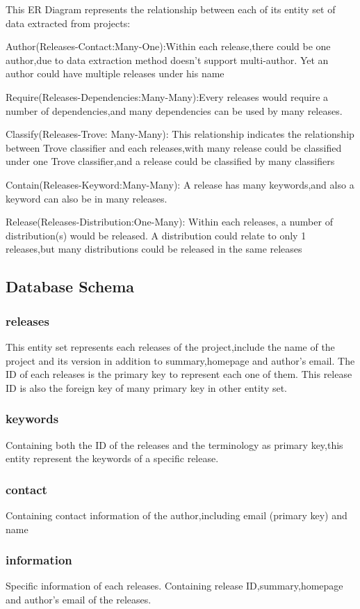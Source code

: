 \documentclass[a4paper,12pt]{article}
\begin{document}
This ER Diagram represents the relationship between each of its entity set of data extracted from projects:

Author(Releases-Contact:Many-One):Within each release,there could be one author,due to data extraction method doesn't support multi-author. Yet an author could have multiple releases under his name

Require(Releases-Dependencies:Many-Many):Every releases would require a number of dependencies,and many dependencies can be used by many releases.

Classify(Releases-Trove: Many-Many): This relationship indicates the relationship between Trove classifier and each releases,with many release could be classified
under one Trove classifier,and a release could be classified by many classifiers

Contain(Releases-Keyword:Many-Many): A release has many keywords,and also a keyword can also be in many releases.
  
Release(Releases-Distribution:One-Many): Within each releases, a number of distribution(s) would be released. A distribution could relate to only 1 releases,but many distributions could be released in the same releases

\subsection{Database Schema}

\subsubsection{releases}
This entity set represents each releases of the project,include the name of the project and its version in addition to summary,homepage and author's email. The ID of each releases is the primary key to represent each one of them.
This release ID is also the foreign key of many primary key in other entity set.
\subsubsection{keywords}
Containing both the ID of the releases and the terminology  as primary key,this entity represent the keywords of a specific release.
\subsubsection{contact}
Containing contact information of the author,including email (primary key) and name
\subsubsection{information}
Specific information of each releases. Containing release ID,summary,homepage and author's email of the releases.
\end{document}
